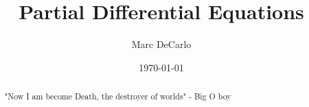 \documentclass[12pt]{article}
\begin{document}
 

\title{Partial Differential Equations}
\author{Marc DeCarlo}
\date{\today}

\maketitle

\begin{abstract}
    "Now I am become Death, the destroyer of worlds"
    - Big O boy
\end{abstract}
\tableofcontents



\end{document}
